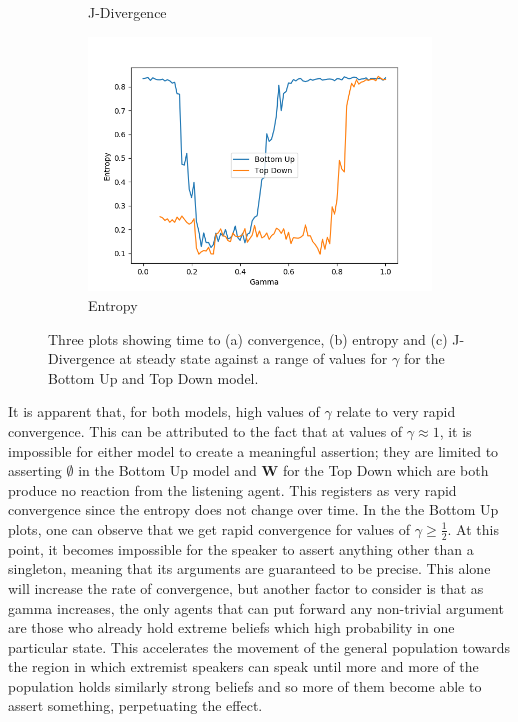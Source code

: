 \begin{figure}[H]
\begin{subfigure}[ht]{0.45\textwidth}
    \caption{J-Divergence}\label{fig:J-Div_convergence}
 \end{subfigure}
 \hfill
 \begin{subfigure}[ht]{0.45\textwidth}
    \includegraphics[width=\textwidth]{Images/Figures/All/Entropy_ALL_n_3_p_100_gamma_100_runs_20.png}
    \caption{Entropy}\label{fig:entropy_convergence}
 \end{subfigure}
 \caption{Three plots showing time to (a) convergence, (b) entropy and (c) J-Divergence at steady state against a range of values for $\gamma$ for the Bottom Up and Top Down model. }\label{fig:convergence_none}
\end{figure}

It is apparent that, for both models, high values of $\gamma$ relate to very rapid convergence. This can be attributed to the fact that at values of $\gamma \approx 1$, it is impossible for either model to create a meaningful assertion; they are limited to asserting $\emptyset$ in the Bottom Up model and $\mathbf{W}$ for the Top Down which are both produce no reaction from the listening agent. This registers as very rapid convergence since the entropy does not change over time. 
In the the Bottom Up plots, one can observe that we get rapid convergence for values of $\gamma \geq \frac{1}{2}$. At this point, it becomes impossible for the speaker to assert anything other than a singleton, meaning that its arguments are guaranteed to be precise. This alone will increase the rate of convergence, but another factor to consider is that as gamma increases, the only agents that can put forward any non-trivial argument are those who already hold extreme beliefs which high probability in one particular state. This accelerates the movement of the general population towards the region in which extremist speakers can speak until more and more of the population holds similarly strong beliefs and so more of them become able to assert something, perpetuating the effect. 

